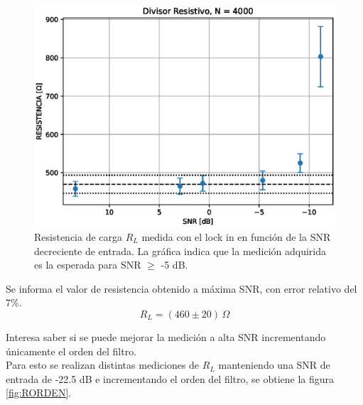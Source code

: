 \documentclass[11pt,a4paper]{extarticle}
\begin{document}
\begin{multicols}{2}
\begin{figure}[H]
	\centering
	\includegraphics[width=\linewidth]{Images/resistencia4000.eps}
	\caption{Resistencia de carga $R_L$ medida con 
	el lock in en función de la SNR decreciente de entrada. La gráfica indica que la medición adquirida es la esperada para SNR $\ge$ -5 dB.}
	\label{fig:RvsSNR}
\end{figure}

Se informa el valor de resistencia obtenido a máxima SNR, con error relativo del 7\%.
\begin{equation*}
	R_L = \left(460 \pm 20\right) \, \Omega
\end{equation*}

Interesa saber si se puede mejorar la medición a alta SNR incrementando únicamente el orden del filtro.\\


Para esto se realizan distintas mediciones de $R_L$
manteniendo una SNR de entrada de -22.5 dB e incrementando el orden del filtro, se obtiene la figura \ref{fig:RORDEN}.\\



\end{multicols}
\end{document}
